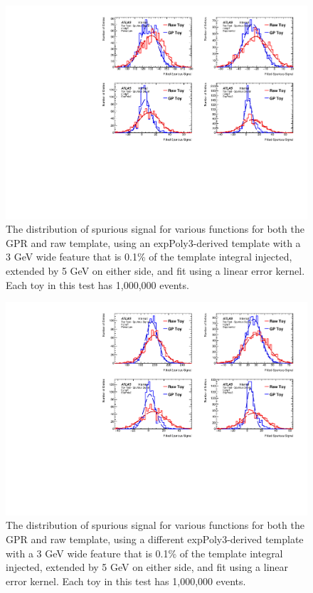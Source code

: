 \begin{figure} 
\begin{center}
  \includegraphics[width=\textwidth]{figures/background/gpr/validation/linear/ToyTest_FitSigVals_medpT_1k_Siginj}   
\caption{The distribution of spurious signal for various functions for both the GPR and raw template, using an expPoly3-derived template with a 3 GeV wide feature that is 0.1\% of the template integral injected, extended by 5 GeV on either side, and fit using a linear error kernel. Each toy in this test has 1,000,000 events.}
\label{fig:linearkernel_medpt_1k_Siginj}
\end{center}
\end{figure}

\begin{figure} 
\begin{center}
  \includegraphics[width=\textwidth]{figures/background/gpr/validation/linear/ToyTest_FitSigVals_highpT_1k_Siginj}   
\caption{The distribution of spurious signal for various functions for both the GPR and raw template, using a different expPoly3-derived template with a 3 GeV wide feature that is 0.1\% of the template integral injected, extended by 5 GeV on either side, and fit using a linear error kernel. Each toy in this test has 1,000,000 events.}
\label{fig:linearkernel_highpt_1k_Siginj}
\end{center}
\end{figure}

